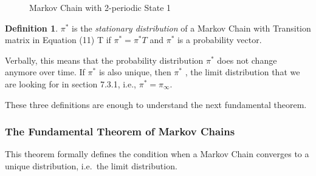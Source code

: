 \documentclass[12pt,english,a4paper,oneside]{article}
\theoremstyle{definition}
\newtheorem{definition}{Definition}[section]
\theoremstyle{definition}
\theoremstyle{definition}
\theoremstyle{definition}
\theoremstyle{remark}
\begin{document}
\begin{figure}[H]
\label{fig:ex3}
\centering

  
  \caption{Markov Chain with 2-periodic State 1}

\end{figure}

\begin{definition}
$\pi^*$ is the \textit{stationary distribution} of a Markov Chain with Transition matrix in Equation (11) T if $\pi^* = \pi^* T$ and $\pi^*$ is a probability vector.
\end{definition}

\noindent
Verbally, this means that the probability distribution \(\pi^*\) does not change anymore over time. If \(\pi^*\) is also unique, then \(\pi^*\) , the limit distribution that we are looking for in section 7.3.1, i.e., \(\pi^*=\pi_{\infty}\).

These three definitions are enough to understand the next fundamental theorem.

\hypertarget{the-fundamental-theorem-of-markov-chains}{%
\subsubsection{The Fundamental Theorem of Markov Chains}\label{the-fundamental-theorem-of-markov-chains}}

This theorem formally defines the condition when a Markov Chain converges to a unique distribution, i.e.~the limit distribution.
\end{document}
